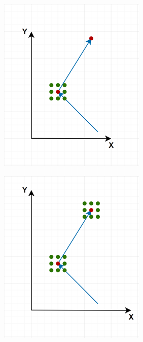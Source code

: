 \documentclass[12pt]{article}
\theoremstyle{definition}
\begin{document}
\begin{figure}
  \centering
  \begin{subfigure}[t]{0.4\textwidth}
    \includegraphics[width=\textwidth]{gaussian_noise_2.jpg}
    \caption{}
  \end{subfigure}
  \begin{subfigure}[t]{0.4\textwidth}
    \includegraphics[width=\textwidth]{gaussian_noise_3.jpg}

\end{subfigure}
\end{figure}
\end{document}

